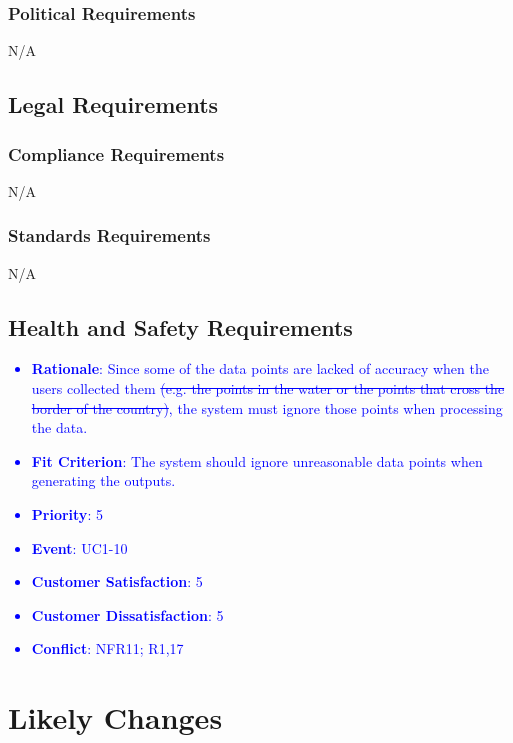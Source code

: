 \documentclass[12pt, titlepage]{article}
\newcounter{reqnum} %
\newcounter{freqnum} %
\begin{document}
\begin{itemize}
\subsubsection{Political Requirements}
N/A
\subsection{Legal Requirements}

\subsubsection{Compliance Requirements}
N/A
\subsubsection{Standards Requirements}
N/A
\subsection{Health and Safety Requirements}
\textcolor{blue}{
\item[NFR\refstepcounter{freqnum}\thefreqnum
\label{NFR}:] 
\begin{itemize}
    \item \textbf{Rationale}: Since some of the data points are lacked of accuracy when the users collected them \sout{(e.g. the points in the water or the points that cross the border of the country)}, the system must ignore those points when processing the data.
    \item \textbf{Fit Criterion}: The system should ignore unreasonable data points when generating the outputs.
    \item \textbf{Priority}: 5
    \item \textbf{Event}: UC1-10%
    \item \textbf{Customer Satisfaction}: 5
    \item \textbf{Customer Dissatisfaction}: 5
    \item \textbf{Conflict}: \textcolor{blue}{NFR11; R1,17}
\end{itemize}
}


\end{itemize}
\section{Likely Changes}
\end{document}
